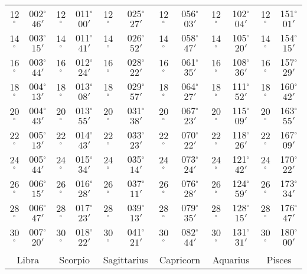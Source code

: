 \begin{table}
{\begin{tabular}{cc|cc|cc|cc|cc|cc}
12$^\circ$ & 002$^\circ$$46'$ & 12$^\circ$ & 011$^\circ$$00'$ & 12$^\circ$ & 025$^\circ$$27'$ & 12$^\circ$ & 056$^\circ$$03'$ & 12$^\circ$ & 102$^\circ$$04'$ & 12$^\circ$ & 151$^\circ$$01'$\\
14$^\circ$ & 003$^\circ$$15'$ & 14$^\circ$ & 011$^\circ$$41'$ & 14$^\circ$ & 026$^\circ$$52'$ & 14$^\circ$ & 058$^\circ$$47'$ & 14$^\circ$ & 105$^\circ$$20'$ & 14$^\circ$ & 154$^\circ$$15'$\\
16$^\circ$ & 003$^\circ$$44'$ & 16$^\circ$ & 012$^\circ$$24'$ & 16$^\circ$ & 028$^\circ$$22'$ & 16$^\circ$ & 061$^\circ$$35'$ & 16$^\circ$ & 108$^\circ$$36'$ & 16$^\circ$ & 157$^\circ$$29'$\\
18$^\circ$ & 004$^\circ$$13'$ & 18$^\circ$ & 013$^\circ$$08'$ & 18$^\circ$ & 029$^\circ$$57'$ & 18$^\circ$ & 064$^\circ$$27'$ & 18$^\circ$ & 111$^\circ$$52'$ & 18$^\circ$ & 160$^\circ$$42'$\\
20$^\circ$ & 004$^\circ$$43'$ & 20$^\circ$ & 013$^\circ$$55'$ & 20$^\circ$ & 031$^\circ$$38'$ & 20$^\circ$ & 067$^\circ$$23'$ & 20$^\circ$ & 115$^\circ$$09'$ & 20$^\circ$ & 163$^\circ$$55'$\\
22$^\circ$ & 005$^\circ$$13'$ & 22$^\circ$ & 014$^\circ$$43'$ & 22$^\circ$ & 033$^\circ$$23'$ & 22$^\circ$ & 070$^\circ$$22'$ & 22$^\circ$ & 118$^\circ$$26'$ & 22$^\circ$ & 167$^\circ$$09'$\\
24$^\circ$ & 005$^\circ$$44'$ & 24$^\circ$ & 015$^\circ$$34'$ & 24$^\circ$ & 035$^\circ$$14'$ & 24$^\circ$ & 073$^\circ$$24'$ & 24$^\circ$ & 121$^\circ$$42'$ & 24$^\circ$ & 170$^\circ$$22'$\\
26$^\circ$ & 006$^\circ$$15'$ & 26$^\circ$ & 016$^\circ$$28'$ & 26$^\circ$ & 037$^\circ$$11'$ & 26$^\circ$ & 076$^\circ$$28'$ & 26$^\circ$ & 124$^\circ$$59'$ & 26$^\circ$ & 173$^\circ$$34'$\\
28$^\circ$ & 006$^\circ$$47'$ & 28$^\circ$ & 017$^\circ$$23'$ & 28$^\circ$ & 039$^\circ$$13'$ & 28$^\circ$ & 079$^\circ$$35'$ & 28$^\circ$ & 128$^\circ$$15'$ & 28$^\circ$ & 176$^\circ$$47'$\\
30$^\circ$ & 007$^\circ$$20'$ & 30$^\circ$ & 018$^\circ$$22'$ & 30$^\circ$ & 041$^\circ$$21'$ & 30$^\circ$ & 082$^\circ$$44'$ & 30$^\circ$ & 131$^\circ$$31'$ & 30$^\circ$ & 180$^\circ$$00'$\\
\multicolumn{12}{c}{}\\
\multicolumn{2}{c}{Libra}\vline & \multicolumn{2}{c}{Scorpio} \vline& \multicolumn{2}{c}{Sagittarius} \vline& \multicolumn{2}{c}{Capricorn}\vline &
\multicolumn{2}{c}{Aquarius}\vline & \multicolumn{2}{c}{Pisces}\\\hline

\end{tabular}}
\end{table}
